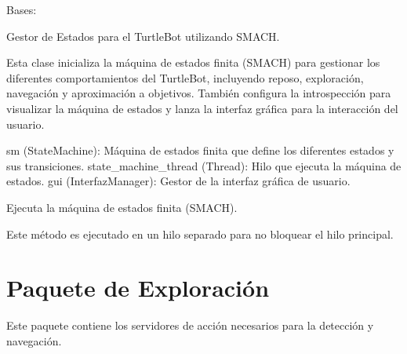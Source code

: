 \documentclass[a4paper,10pt,spanish]{sphinxmanual}
\begin{document}
\begin{fulllineitems}
\label{\detokenize{squad_state_manager:squad_state_manager.TurtleBotStateManager}}
\pysigstartsignatures
{}
\pysigstopsignatures
\sphinxAtStartPar
Bases: 

\sphinxAtStartPar
Gestor de Estados para el TurtleBot utilizando SMACH.

\sphinxAtStartPar
Esta clase inicializa la máquina de estados finita (SMACH) para gestionar los diferentes
comportamientos del TurtleBot, incluyendo reposo, exploración, navegación y aproximación a
objetivos. También configura la introspección para visualizar la máquina de estados y
lanza la interfaz gráfica para la interacción del usuario.
\begin{description}
\sphinxAtStartPar
sm (StateMachine): Máquina de estados finita que define los diferentes estados y sus transiciones.
state\_machine\_thread (Thread): Hilo que ejecuta la máquina de estados.
gui (InterfazManager): Gestor de la interfaz gráfica de usuario.

\end{description}

\begin{fulllineitems}
\label{\detokenize{squad_state_manager:squad_state_manager.TurtleBotStateManager.run_state_machine}}
\pysigstartsignatures
{}
\pysigstopsignatures
\sphinxAtStartPar
Ejecuta la máquina de estados finita (SMACH).

\sphinxAtStartPar
Este método es ejecutado en un hilo separado para no bloquear el hilo principal.

\end{fulllineitems}


\end{fulllineitems}


\sphinxstepscope


\section{Paquete de Exploración}
\label{\detokenize{pkg_exploracion:paquete-de-exploracion}}\label{\detokenize{pkg_exploracion::doc}}
\sphinxAtStartPar
Este paquete contiene los servidores de acción necesarios para la detección y navegación.
\end{document}
